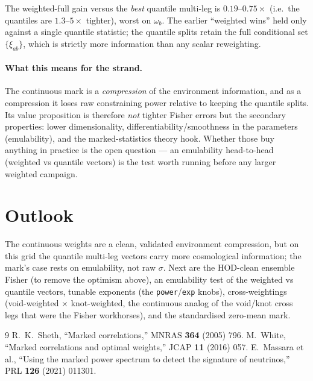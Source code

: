 \documentclass[11pt]{article}
\newcommand{\code}[1]{\texttt{#1}}
\begin{document}
\noindent The weighted-full gain versus the \emph{best} quantile multi-leg is
$0.19$--$0.75\times$ (i.e.\ the quantiles are $1.3$--$5\times$ tighter), worst on
$\omega_b$.  The earlier ``weighted wins'' held only against a single quantile
statistic; the quantile splits retain the full conditional set $\{\xi_{ab}\}$, which
is strictly more information than any scalar reweighting.

\paragraph{What this means for the strand.}  The continuous mark is a
\emph{compression} of the environment information, and as a compression it loses raw
constraining power relative to keeping the quantile splits.  Its value proposition is
therefore \emph{not} tighter Fisher errors but the secondary properties: lower
dimensionality, differentiability/smoothness in the parameters (emulability), and the
marked-statistics theory hook.  Whether those buy anything in practice is the open
question --- an emulability head-to-head (weighted vs quantile vectors) is the test
worth running before any larger weighted campaign.

\section{Outlook}
The continuous weights are a clean, validated environment compression, but on this
grid the quantile multi-leg vectors carry more cosmological information; the mark's
case rests on emulability, not raw $\sigma$.  Next
are the HOD-clean ensemble Fisher (to remove the optimism above), an emulability
test of the weighted vs quantile vectors, tunable exponents (the
\code{power}/\code{exp} knobs), cross-weightings (void-weighted $\times$
knot-weighted, the continuous analog of the void/knot cross legs that were the
Fisher workhorses), and the standardised zero-mean mark.

\begin{thebibliography}{9}
 R.~K.~Sheth, ``Marked correlations,'' MNRAS \textbf{364} (2005) 796.
 M.~White, ``Marked correlations and optimal weights,'' JCAP \textbf{11} (2016) 057.
 E.~Massara et al., ``Using the marked power spectrum to detect the signature of neutrinos,'' PRL \textbf{126} (2021) 011301.
\end{thebibliography}
\end{document}
